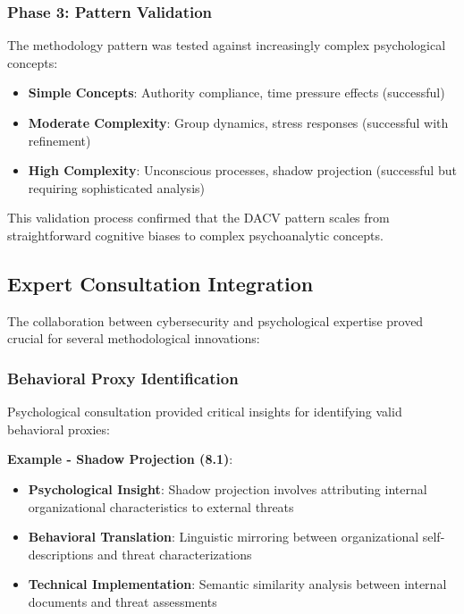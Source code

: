 \documentclass[11pt, onecolumn]{article}
\begin{document}
\subsubsection{Phase 3: Pattern Validation}

The methodology pattern was tested against increasingly complex psychological concepts:

\begin{itemize}
\item \textbf{Simple Concepts}: Authority compliance, time pressure effects (successful)
\item \textbf{Moderate Complexity}: Group dynamics, stress responses (successful with refinement)
\item \textbf{High Complexity}: Unconscious processes, shadow projection (successful but requiring sophisticated analysis)
\end{itemize}

This validation process confirmed that the DACV pattern scales from straightforward cognitive biases to complex psychoanalytic concepts.

\subsection{Expert Consultation Integration}

The collaboration between cybersecurity and psychological expertise proved crucial for several methodological innovations:

\subsubsection{Behavioral Proxy Identification}

Psychological consultation provided critical insights for identifying valid behavioral proxies:

\textbf{Example - Shadow Projection (8.1)}:
\begin{itemize}
\item \textbf{Psychological Insight}: Shadow projection involves attributing internal organizational characteristics to external threats
\item \textbf{Behavioral Translation}: Linguistic mirroring between organizational self-descriptions and threat characterizations
\item \textbf{Technical Implementation}: Semantic similarity analysis between internal documents and threat assessments
\end{itemize}
\end{document}
